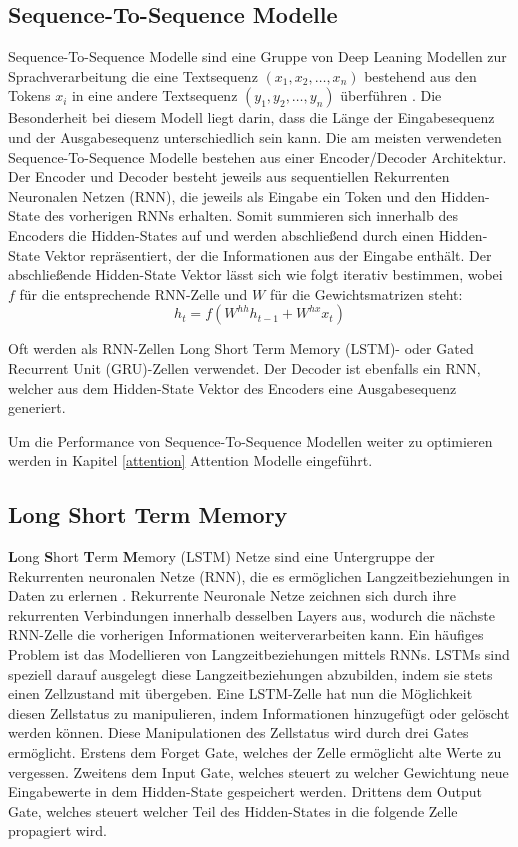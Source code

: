 \subsection{Sequence-To-Sequence Modelle}
Sequence-To-Sequence Modelle sind eine Gruppe von Deep Leaning Modellen zur Sprachverarbeitung die eine Textsequenz $(x_1,x_2,\ldots,x_n)$ bestehend aus den Tokens $x_i$ in eine andere Textsequenz $(y_1,y_2,\ldots,y_n)$ überführen \citep{DBLP:journals/corr/SutskeverVL14}.
Die Besonderheit bei diesem Modell liegt darin, dass die Länge der Eingabesequenz und der Ausgabesequenz unterschiedlich sein kann.
Die am meisten verwendeten Sequence-To-Sequence Modelle bestehen aus einer Encoder/Decoder Architektur.
Der Encoder und Decoder besteht jeweils aus sequentiellen Rekurrenten Neuronalen Netzen (RNN), die jeweils als Eingabe ein Token und den Hidden-State des vorherigen RNNs erhalten.
Somit summieren sich innerhalb des Encoders die Hidden-States auf und werden abschließend durch einen Hidden-State Vektor repräsentiert, der die Informationen aus der Eingabe enthält.
Der abschließende Hidden-State Vektor lässt sich wie folgt iterativ bestimmen, wobei $f$ für die entsprechende RNN-Zelle und $W$ für die Gewichtsmatrizen steht:
\begin{equation}
    h_t = f(W^{hh}h_{t-1}+W^{hx}x_t)
\end{equation}

Oft werden als RNN-Zellen Long Short Term Memory (LSTM)- oder Gated Recurrent Unit (GRU)-Zellen verwendet.
Der Decoder ist ebenfalls ein RNN, welcher aus dem Hidden-State Vektor des Encoders eine Ausgabesequenz generiert.

Um die Performance von Sequence-To-Sequence Modellen weiter zu optimieren werden in Kapitel \ref{attention} Attention Modelle eingeführt.


\subsection{\textbf{L}ong \textbf{S}hort \textbf{T}erm \textbf{M}emory}
\textbf{L}ong \textbf{S}hort \textbf{T}erm \textbf{M}emory (LSTM) Netze sind eine Untergruppe der Rekurrenten neuronalen Netze (RNN), die es ermöglichen Langzeitbeziehungen in Daten zu erlernen \citep{lstm}.
Rekurrente Neuronale Netze zeichnen sich durch ihre rekurrenten Verbindungen innerhalb desselben Layers aus, wodurch die nächste RNN-Zelle die vorherigen Informationen weiterverarbeiten kann.
Ein häufiges Problem ist das Modellieren von Langzeitbeziehungen mittels RNNs. 
LSTMs sind speziell darauf ausgelegt diese Langzeitbeziehungen abzubilden, indem sie stets einen Zellzustand mit übergeben.
Eine LSTM-Zelle hat nun die Möglichkeit diesen Zellstatus zu manipulieren, indem Informationen hinzugefügt oder gelöscht werden können.
Diese Manipulationen des Zellstatus wird durch drei Gates ermöglicht. 
Erstens dem Forget Gate, welches der Zelle ermöglicht alte Werte zu vergessen.
Zweitens dem Input Gate, welches steuert zu welcher Gewichtung neue Eingabewerte in dem Hidden-State gespeichert werden.
Drittens dem Output Gate, welches steuert welcher Teil des Hidden-States in die folgende Zelle propagiert wird.

